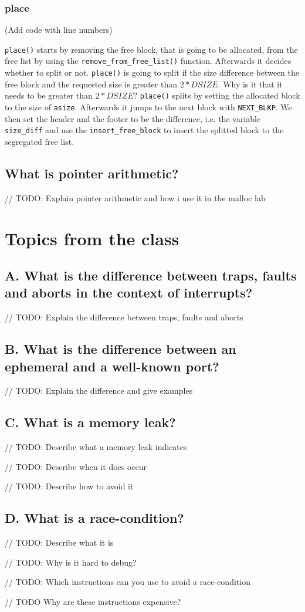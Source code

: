 \documentclass[11pt]{article}
\newcommand{\code}[1]{{\colorbox{lightgray!15}{\color{orange}\texttt{#1}}}}
\newcommand{\temp}[1]{{\color{red}#1}}
\begin{document}
\subsubsection{place}
\temp{(Add code with line numbers)}

\code{place()} starts by removing the free block, that is going to be allocated, from the free list by using the \code{remove\_from\_free\_list()} function. 
Afterwards it decides whether to split or not. \code{place()} is going to split if the size difference between the free block and the requested size is greater than $2 * DSIZE$.
\temp{Why is it that it needs to be greater than $2 * DSIZE$?}
\code{place()} splits by setting the allocated block to the size of \code{asize}. Afterwards it jumps to the next block with \code{NEXT\_BLKP}.
We then set the header and the footer to be the difference, i.e. the variable \code{size\_diff} and use the \code{insert\_free\_block} to insert the splitted block to the segregated free list.

\subsection{What is pointer arithmetic?}

// TODO: Explain pointer arithmetic and how i use it in the malloc lab

\section{Topics from the class}

\subsection{A. What is the difference between traps, faults and aborts in the context of interrupts?}

// TODO: Explain the difference between traps, faults and aborts

\subsection{B. What is the difference between an ephemeral and a well-known port?}

// TODO: Explain the difference and give examples

\subsection{C. What is a memory leak?}
// TODO: Describe what a memory leak indicates

// TODO: Describe when it does occur

// TODO: Describe how to avoid it

\subsection{D. What is a race-condition?}

// TODO: Describe what it is

// TODO: Why is it hard to debug?

// TODO: Which instructions can you use to avoid a race-condition

// TODO Why are these instructions expensive?
\end{document}
